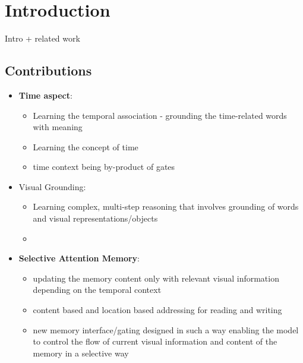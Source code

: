 \section{Introduction}

Intro + related work


\subsection{Contributions}

\begin{itemize}
\item \textbf{Time aspect}:
\begin{itemize}
\item Learning the temporal association - grounding the time-related words with meaning
\item Learning the concept of time
\item time context being by-product of gates
\end{itemize}

\item Visual Grounding:
\begin{itemize}
\item Learning complex, multi-step reasoning that involves grounding of words and visual representations/objects
\item 
\end{itemize}
\item \textbf{Selective Attention Memory}:
\begin{itemize}
\item updating the memory content only with relevant visual information depending on the temporal context
\item content based and location based addressing for reading and writing
\item new memory interface/gating designed in such a way enabling the model to control the flow of current visual information and content of the memory in a selective way

\end{itemize}
\end{itemize}







